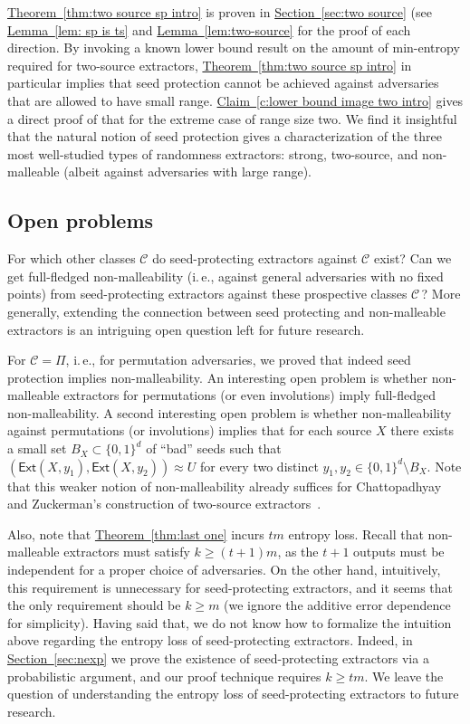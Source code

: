\documentclass[11pt]{article}
\numberwithin{equation}{section}
\theoremstyle{definition}
\theoremstyle{plain}
\newcommand{\ie}{i.\,e.}
\newcommand{\expref}[2]{\hyperref[#2]{#1~\ref{#2}}}
\newcommand{\ext}{\mathsf{Ext}}
\begin{document}
\expref{Theorem}{thm:two source sp intro} is proven in \expref{Section}{sec:two source} (see \expref{Lemma}{lem: sp is ts} and \expref{Lemma}{lem:two-source} for the proof of each direction. %
By invoking a known lower bound result on the amount of min-entropy required for two-source extractors, \expref{Theorem}{thm:two source sp intro} in particular implies that seed protection cannot be achieved against adversaries that are allowed to have small range. \expref{Claim}{c:lower bound image two intro} gives a direct proof of that for
%
%
the  %
extreme case of range size two. We find it insightful that the
%
natural notion of seed protection gives a characterization of the three most well-studied types of randomness extractors: strong, two-source, and non-malleable (albeit against adversaries with large range).



\subsection{Open problems}

For which other classes $\mathcal{C}$ do seed-protecting extractors against $\mathcal{C}$ exist?
Can we get full-fledged non-malleability (\ie,
against general adversaries with no fixed points) from seed-protecting extractors against these prospective %
%
classes $\mathcal C\,$?
More generally, extending the connection between seed protecting and non-malleable extractors is an intriguing open question left for future research.

%
%
%
%
%

For $\mathcal{C} = \Pi$, \ie, for permutation adversaries, we proved that indeed seed protection implies 
non-malleability. An interesting open problem is whether non-malleable extractors for permutations (or even involutions) imply full-fledged non-malleability.
A second interesting open problem is whether non-malleability against permutations (or involutions) implies that for each source $X$ there exists a small set $B_X \subset \{0,1\}^d$ of
``bad'' seeds such that $(\ext(X,y_1),\ext(X,y_2)) \approx U$ for every two distinct $y_1,y_2 \in \{0,1\}^d \setminus B_X$. Note that this 
weaker notion of non-malleability already suffices for Chattopadhyay and Zuckerman's construction of %
two-source  %
extractors~\cite{CZ19}.

Also, note that \expref{Theorem}{thm:last one} incurs $tm$ entropy loss. Recall that non-malleable extractors must satisfy $k \ge (t+1)m$, as the $t+1$ outputs must be independent for a proper choice of adversaries. On the other hand, intuitively, this requirement is unnecessary for seed-protecting extractors, and it seems that the only requirement should be $k \ge m$ (we ignore the additive error dependence for simplicity).  Having said that, we do not know how to formalize the intuition above regarding the entropy loss of seed-protecting extractors. Indeed, in \expref{Section}{sec:nexp} we prove the existence of seed-protecting extractors via a probabilistic argument, and our proof technique requires $k \ge tm$. We leave the question of understanding the entropy loss of seed-protecting extractors to future research.
\end{document}
